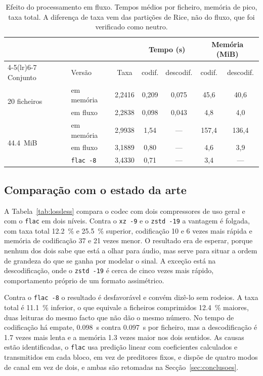 \documentclass[a4paper,11pt]{article}
\newcommand{\prog}[1]{\texttt{#1}}
\begin{document}
\begin{table}[htbp]
\centering
\caption{Efeito do processamento em fluxo. Tempos médios por ficheiro, memória
de pico, taxa total. A diferença de taxa vem das partições de Rice, não do
fluxo, que foi verificado como neutro.}
\label{tab:fluxo}
\small
\begin{tabular}{l l c cc cc}
\toprule
 & & & \multicolumn{2}{c}{Tempo (s)} & \multicolumn{2}{c}{Memória (MiB)} \\
\cmidrule(lr){4-5}\cmidrule(lr){6-7}
Conjunto & Versão & Taxa & codif. & descodif. & codif. & descodif. \\
\midrule
\multirow{2}{*}{20 ficheiros}
 & em memória & 2,2416 & 0,209 & 0,075 & 45,6 & 40,6 \\
 & em fluxo   & 2,2838 & 0,098 & 0,043 & 4,8 & 4,0 \\
\midrule
\multirow{3}{*}{\SI{44,4}{MiB}}
 & em memória & 2,9938 & 1,54 & --- & 157,4 & 136,4 \\
 & em fluxo   & 3,1889 & 0,80 & --- & 4,6 & 3,9 \\
 & \texttt{flac -8} & 3,4330 & 0,71 & --- & 3,4 & --- \\
\bottomrule
\end{tabular}
\end{table}

\subsection{Comparação com o estado da arte}
\label{sec:ll-cmp}
A Tabela~\ref{tab:lossless} compara o codec com dois compressores de uso geral e
com o \prog{flac} em dois níveis. Contra o \texttt{xz -9} e o \texttt{zstd -19}
a vantagem é folgada, com taxa total \SI{12,2}{\percent} e \SI{25,5}{\percent}
superior, codificação \num{10} e \num{6} vezes mais rápida e memória de
codificação \num{37} e \num{21} vezes menor. O resultado era de esperar, porque
nenhum dos dois sabe que está a olhar para áudio, mas serve para situar a ordem
de grandeza do que se ganha por modelar o sinal. A exceção está na
descodificação, onde o \texttt{zstd -19} é cerca de cinco vezes mais rápido,
comportamento próprio de um formato assimétrico.

Contra o \texttt{flac -8} o resultado é desfavorável e convém dizê-lo sem
rodeios. A taxa total é \SI{11,1}{\percent} inferior, o que equivale a ficheiros
comprimidos \SI{12,4}{\percent} maiores, duas leituras do mesmo facto que não
dão o mesmo número. No tempo de codificação há empate, \SI{0,098}{\second}
contra \SI{0,097}{\second} por ficheiro, mas a descodificação é \num{1,7} vezes
mais lenta e a memória \num{1,3} vezes maior nos dois sentidos. As causas estão
identificadas, o \prog{flac} usa predição linear com coeficientes calculados e
transmitidos em cada bloco, em vez de preditores fixos, e dispõe de quatro modos
de canal em vez de dois, e ambas são retomadas na Secção~\ref{sec:conclusoes}.
\end{document}
